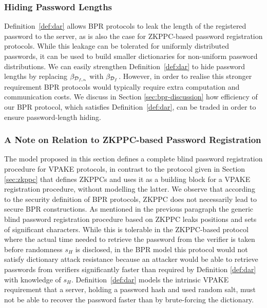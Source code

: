 \subsubsection{Hiding Password Lengths}\label{sec:strongerDAR}
Definition~\ref{def:dar} allows \ac{BPR} protocols to leak the length of the registered password to the server, as is also the case for \ac{ZKPPC}-based password registration protocols. 
While this leakage can be tolerated for uniformly distributed passwords, it can be used to build smaller dictionaries for non-uniform password distributions. 
We can easily strengthen Definition~\ref{def:dar} to hide password lengths by replacing $\beta_{\mathcal{D}_{f,n}}$ with $\beta_{\mathcal{D}_f}$. 
However, in order to realise this stronger requirement \ac{BPR} protocols would typically require extra computation and communication costs. 
We discuss in Section \ref{sec:bpr-discussion} how efficiency of our \ac{BPR} protocol, which satisfies Definition~\ref{def:dar}, can be traded in order to ensure password-length hiding.

\subsubsection{A Note on Relation to ZKPPC-based Password Registration}
The model proposed in this section defines a complete blind password registration procedure for \ac{VPAKE} protocols, in contrast to the protocol given in Section \ref{sec:zkppc} that defines \acp{ZKPPC} and uses it as a building block for a \ac{VPAKE} registration procedure, without modelling the latter. 
We observe that according to the security definition of \ac{BPR} protocols, \ac{ZKPPC} does not necessarily lead to secure \ac{BPR} constructions. 
As mentioned in the previous paragraph the generic blind password registration procedure based on \ac{ZKPPC} leaks positions and sets of significant characters. 
While this is tolerable in the \ac{ZKPPC}-based protocol where the actual time needed to retrieve the password from the verifier is taken before randomness $s_H$ is disclosed, in the \ac{BPR} model this protocol would not satisfy dictionary attack resistance because an attacker would be able to retrieve passwords from verifiers significantly faster than required by Definition \ref{def:dar} with knowledge of $s_H$.
Definition~\ref{def:dar} models the intrinsic \ac{VPAKE} requirement that a server, holding a password hash and used random salt, must not be able to recover the password faster than by brute-forcing the dictionary. 

